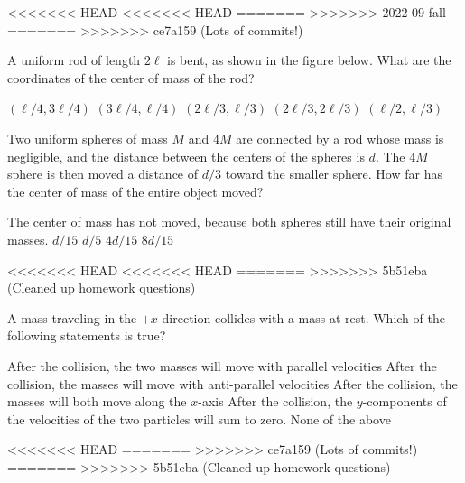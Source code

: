 \documentclass{../../oss-apphys-exam}
\begin{document}
\genheader

<<<<<<< HEAD
<<<<<<< HEAD
=======
>>>>>>> 2022-09-fall
=======
>>>>>>> ce7a159 (Lots of commits!)

\genmultidirections

\gengravity

\raggedcolumns
\begin{multicols*}{2}
  \begin{questions}
    \question A uniform rod of length $2\ell$ is bent, as shown in the figure
    below. What are the coordinates of the center of mass of the rod?
    \begin{center}
    \end{center}
    \begin{choices}
      \choice $(\ell/4,3\ell/4)$
      \correctchoice $(3\ell/4,\ell/4)$
      \choice $(2\ell/3,\ell/3)$
      \choice $(2\ell/3,2\ell/3)$
      \choice $(\ell/2,\ell/3)$
    \end{choices}

    \question Two uniform spheres of mass $M$ and $4M$ are connected by a rod
    whose mass is negligible, and the distance between the centers of the
    spheres is $d$. The $4M$ sphere is then moved a distance of $d/3$ toward the
    smaller sphere. How far has the center of mass of the entire object moved?
    \begin{choices}
      \choice The center of mass has not moved, because both spheres still have
      their original masses.
      \choice $d/15$
      \choice $d/5$
      \correctchoice $4d/15$
      \choice $8d/15$
    \end{choices}
<<<<<<< HEAD
<<<<<<< HEAD
=======
>>>>>>> 5b51eba (Cleaned up homework questions)

    \question A mass traveling in the $+x$ direction collides with a mass at
    rest. Which of the following statements is true?
    \begin{choices}
      \choice After the collision, the two masses will move with parallel
      velocities
      \choice After the collision, the masses will move with anti-parallel
      velocities
      \choice After the collision, the masses will both move along the $x$-axis
      \choice After the collision, the $y$-components of the velocities of the
      two particles will sum to zero.
      \choice None of the above
    \end{choices}
    \columnbreak
<<<<<<< HEAD
=======
>>>>>>> ce7a159 (Lots of commits!)
=======
>>>>>>> 5b51eba (Cleaned up homework questions)
    

\end{questions}
\end{multicols*}
\end{document}
